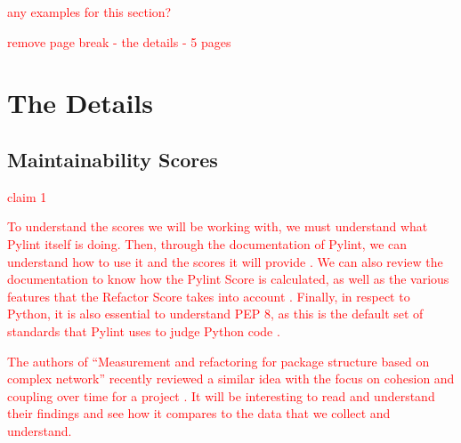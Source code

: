 \documentclass[12pt,conference]{IEEEtran}
\newcommand\todo[1]{\textcolor{red}{#1}}
\begin{document}
\todo{any examples for this section?}

\newpage \todo{remove page break - the details - 5 pages}

\section{The Details}


\subsection{Maintainability Scores} \label{sectionMaintainabilityScores}


\todo{claim 1}

\todo{To understand the scores we will be working with, we must understand what Pylint itself is doing. Then, through the documentation of Pylint, we can understand how to use it and the scores it will provide \cite{pylint:main}. We can also review the documentation to know how the Pylint Score is calculated, as well as the various features that the Refactor Score takes into account \cite{pylint:score}. Finally, in respect to Python, it is also essential to understand PEP 8, as this is the default set of standards that Pylint uses to judge Python code \cite{pylint:pep8}.}

\todo{The authors of ``Measurement and refactoring for package structure based on complex network'' recently reviewed a similar idea with the focus on cohesion and coupling over time for a project \cite{zhou:2020}. It will be interesting to read and understand their findings and see how it compares to the data that we collect and understand.}
\end{document}
